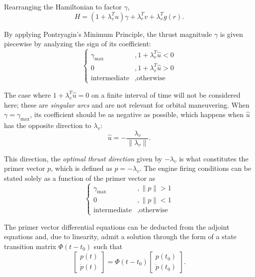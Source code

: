 Rearranging the Hamiltonian to factor \(\gamma \), 
\begin{equation}
    H = (1 + \lambda_v^T \hat u) \gamma + \lambda_r^T v + \lambda_v^T g(r).
\end{equation}

By applying Pontryagin's Minimum Principle, the thrust magnitude \(\gamma\) is given piecewise by analyzing the sign of its coefficient:
\begin{equation}
    \begin{cases}
        \gamma_{\max}&, 1+\lambda_v^T \hat u < 0 \\
        0&, 1 + \lambda_v^T \hat u > 0 \\
        \text{intermediate}&, \text{otherwise}
    \end{cases}
\end{equation}

The case where \(1 + \lambda_v^T \hat u = 0\) on a finite interval of time will not be considered here; these are \textit{singular arcs} and are not relevant for orbital maneuvering. When \(\gamma = \gamma_{\max}\), its coefficient should be as negative as possible, which happens when \(\hat{u}\) has the opposite direction to \(\lambda_v\):
\begin{equation}
    \hat u = - \frac{\lambda_v}{\lVert \lambda_v \rVert}.
\end{equation}

This direction, the \textit{optimal thrust direction} given by \(-\lambda_v\) is what constitutes the primer vector \(p\), which is defined as \(p = -\lambda_v\). The engine firing conditions can be stated solely as a function of the primer vector as~\cite{Conway_2010}
\begin{equation}
    \begin{cases}
        \gamma_{\max}&, \lVert p \rVert > 1 \\
        0&, \lVert p \rVert < 1 \\
        \text{intermediate}&, \text{otherwise}
    \end{cases}
\end{equation}

The primer vector differential equations can be deducted from the adjoint equations and, due to linearity, admit a solution through the form of a state transition matrix \(\Phi(t - t_0)\) such that
\begin{equation}
    \begin{bmatrix}
        p(t) \\ \dot p(t)
    \end{bmatrix} = \Phi(t - t_0) \begin{bmatrix}
        p(t_0) \\ \dot p(t_0)
    \end{bmatrix}.
\end{equation}

